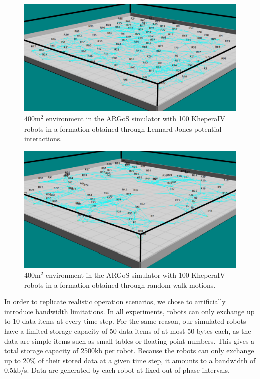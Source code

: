 \begin{figure}[htbp]
	\centering
    \includegraphics[width=\columnwidth]{figures/dora_mesh/argos_lennard.png}
    \caption[Lennard-Jones potential formation in ARGoS]{$400 \text{m}^2$ environment in the ARGoS simulator with 100 KheperaIV robots in a formation obtained through Lennard-Jones potential interactions.}
    \label{argos:lennard-jones}
\end{figure}

\begin{figure}[htbp]
	\centering
    \includegraphics[width=\columnwidth]{figures/dora_mesh/argos_random.png}
    \caption[Random formation in ARGoS]{$400 \text{m}^2$ environment in the ARGoS simulator with 100 KheperaIV robots in a formation obtained through random walk motions.}
    \label{argos:random-walk}
\end{figure}

In order to replicate realistic operation scenarios, we chose to artificially introduce bandwidth limitations. In all experiments, robots can only exchange up to 10 data items at every time step. For the same reason, our simulated robots have a limited storage capacity of 50 data items of at most 50 bytes each, as the data are simple items such as small tables or floating-point numbers. This gives a total storage capacity of 2500kb per robot. Because the robots can only exchange up to 20\% of their stored data at a given time step, it amounts to a bandwidth of 0.5kb/s. Data are generated by each robot at fixed out of phase intervals. 

